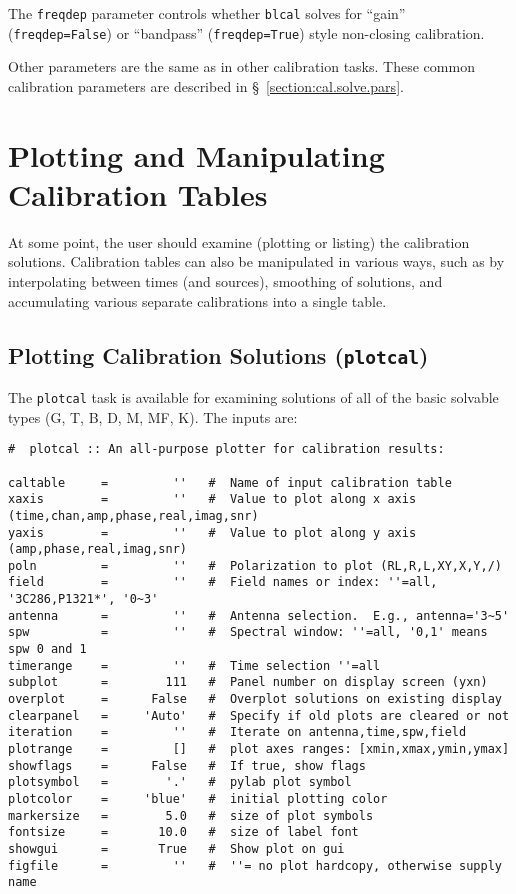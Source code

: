 The {\tt freqdep} parameter controls whether {\tt blcal} solves for 
``gain'' ({\tt freqdep=False}) or ``bandpass'' ({\tt freqdep=True})
style non-closing calibration.

Other parameters are the same as in other calibration tasks.
These common calibration parameters are described in
\S~\ref{section:cal.solve.pars}.

\section{Plotting and Manipulating Calibration Tables}
\label{section:cal.tables}

At some point, the user should examine (plotting or listing) the
calibration solutions.
Calibration tables can also be manipulated in various ways, such as
by interpolating between times (and sources), smoothing of solutions,
and accumulating various separate calibrations into a single 
table.

\subsection{Plotting Calibration Solutions ({\tt plotcal})}
\label{section:cal.tables.plotcal}

The {\tt plotcal} task is available for examining solutions of all of
the basic solvable types (G, T, B, D, M, MF, K).  The inputs are:
\small
\begin{verbatim}
#  plotcal :: An all-purpose plotter for calibration results:

caltable     =         ''   #  Name of input calibration table
xaxis        =         ''   #  Value to plot along x axis (time,chan,amp,phase,real,imag,snr)
yaxis        =         ''   #  Value to plot along y axis (amp,phase,real,imag,snr)
poln         =         ''   #  Polarization to plot (RL,R,L,XY,X,Y,/)
field        =         ''   #  Field names or index: ''=all, '3C286,P1321*', '0~3'
antenna      =         ''   #  Antenna selection.  E.g., antenna='3~5'
spw          =         ''   #  Spectral window: ''=all, '0,1' means spw 0 and 1
timerange    =         ''   #  Time selection ''=all
subplot      =        111   #  Panel number on display screen (yxn)
overplot     =      False   #  Overplot solutions on existing display
clearpanel   =     'Auto'   #  Specify if old plots are cleared or not
iteration    =         ''   #  Iterate on antenna,time,spw,field
plotrange    =         []   #  plot axes ranges: [xmin,xmax,ymin,ymax]
showflags    =      False   #  If true, show flags
plotsymbol   =        '.'   #  pylab plot symbol
plotcolor    =     'blue'   #  initial plotting color
markersize   =        5.0   #  size of plot symbols
fontsize     =       10.0   #  size of label font
showgui      =       True   #  Show plot on gui
figfile      =         ''   #  ''= no plot hardcopy, otherwise supply name
\end{verbatim}
\normalsize

